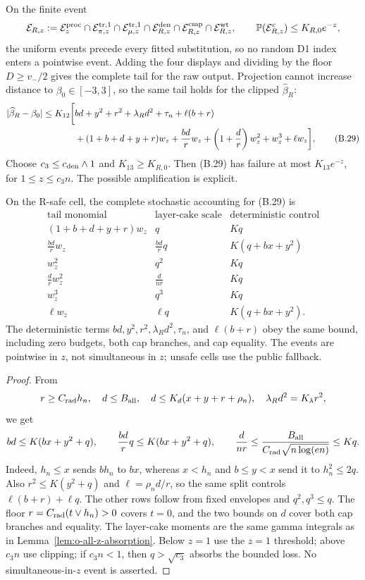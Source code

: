 On the finite event
\[
 \mathcal E_{R,z}:=
 \mathcal E_z^{\rm proc}\cap\mathcal E_{\pi,z}^{\rm tr,1}\cap
 \mathcal E_{\mu,z}^{\rm tr,1}\cap\mathcal E_{R,z}^{\rm den}\cap
 \mathcal E_{R,z}^{\rm cmp}\cap\mathcal E_{R,z}^{\rm wt},
 \qquad \mathbb P(\mathcal E_{R,z}^c)\le K_{R,0}e^{-z},
\]
the uniform events precede every fitted substitution, so no random D1
index enters a pointwise event.  Adding the four displays and dividing by
the floor \(D\ge v_-/2\) gives the complete tail for the raw output.
Projection cannot increase distance to \(\beta_0\in[-3,3]\), so the same
tail holds for the clipped \(\widehat\beta_R\):
\begin{align}
 \lvert \widehat\beta_R-\beta_0\rvert
 \le K_{12}\bigg[&bd+y^2+r^2+\lambda_Rd^2+\tau_n+\ell(b+r)\nonumber\\
 &+(1+b+d+y+r)w_z+\frac{bd}{r}w_z
 +\left(1+\frac d r\right)w_z^2+w_z^3+\ell w_z\bigg],
 \tag{B.29}
\end{align}
Choose \(c_3\le c_{\rm den}\wedge1\) and
\(K_{13}\ge K_{R,0}\).  Then (B.29) has failure at most
\(K_{13}e^{-z}\), for \(1\le z\le c_3n\).  The possible amplification is
explicit.
\begin{lemma}
\label{lem:r-all-z-absorption}
On the R-safe cell, the complete stochastic accounting for (B.29) is
\[
\begin{array}{c|c|c}
\text{tail monomial}&\text{layer-cake scale}&\text{deterministic control}\\ \hline
(1+b+d+y+r)w_z&q&Kq\\
\frac{bd}{r}w_z&\frac{bd}{r}q&K(q+bx+y^2)\\
w_z^2&q^2&Kq\\
\frac d r w_z^2&\frac d{nr}&Kq\\
w_z^3&q^3&Kq\\
\ell w_z&\ell q&K(q+bx+y^2).
\end{array}
\]
The deterministic terms \(bd,y^2,r^2,\lambda_Rd^2,\tau_n\), and
\(\ell(b+r)\) obey the same bound, including zero budgets, both cap
branches, and cap equality.  The events are pointwise in \(z\), not
simultaneous in \(z\); unsafe cells use the public fallback.
\end{lemma}
\begin{proof}
From
\[
 r\ge C_{\rm rad}h_n,\quad d\le B_{\rm all},\quad
 d\le K_d(x+y+r+\rho_n),\quad \lambda_Rd^2=K_\lambda r^2,
\]
we get
\[
 bd\le K(bx+y^2+q),\qquad
 \frac{bd}{r}q\le K(bx+y^2+q),\qquad
 \frac d{nr}\le\frac{B_{\rm all}}
 {C_{\rm rad}\sqrt{n\log(en)}}\le Kq.
\]
Indeed, \(h_n\le x\) sends \(bh_n\) to \(bx\), whereas
\(x<h_n\) and \(b\le y<x\) send it to \(h_n^2\le2q\).
Also \(r^2\le K(y^2+q)\) and \(\ell=\rho_nd/r\), so the same split
controls \(\ell(b+r)+\ell q\).  The other rows follow from fixed envelopes
and \(q^2,q^3\le q\).  The floor \(r=C_{\rm rad}(t\vee h_n)>0\) covers
\(t=0\), and the two bounds on \(d\) cover both cap branches and equality.
The layer-cake moments are the same gamma integrals as in
Lemma~\ref{lem:o-all-z-absorption}.  Below \(z=1\) use the \(z=1\)
threshold; above \(c_3n\) use clipping; if \(c_3n<1\), then
\(q>\sqrt{c_3}\) absorbs the bounded loss.  No simultaneous-in-\(z\) event
is asserted.
\end{proof}
